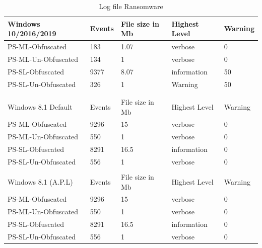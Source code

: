 \documentclass{article}%
\begin{document}
\begin{table}[]
\caption {Log file Ransomware}
\begin{center}
\begin{tabular}{|l|l|l|l|l|}
\hline
Windows 10/2016/2019 & Events & File size in Mb & Highest Level & Warning \\\hline
PS-ML-Obfuscated     & 183    & 1.07            & verbose       & 0       \\\hline
PS-ML-Un-Obfuscated  & 134    & 1               & verbose       & 0       \\\hline
PS-SL-Obfuscated     & 9377   & 8.07            & information   & 50      \\\hline
PS-SL-Un-Obfuscated  & 326    & 1               & Warning       & 50      \\\hline
                     &        &                 &               &         \\\hline
                     &        &                 &               &         \\\hline
Windows 8.1 Default  & Events & File size in Mb & Highest Level & Warning \\\hline
PS-ML-Obfuscated     & 9296   & 15              & verbose       & 0       \\\hline
PS-ML-Un-Obfuscated  & 550    & 1               & verbose       & 0       \\\hline
PS-SL-Obfuscated     & 8291   & 16.5            & information   & 0       \\\hline
PS-SL-Un-Obfuscated  & 556    & 1               & verbose       & 0       \\\hline
                     &        &                 &               &         \\\hline
Windows 8.1 (A.P.L)  & Events & File size in Mb & Highest Level & Warning \\\hline
PS-ML-Obfuscated     & 9296   & 15              & verbose       & 0       \\\hline
PS-ML-Un-Obfuscated  & 550    & 1               & verbose       & 0       \\\hline
PS-SL-Obfuscated     & 8291   & 16.5            & information   & 0       \\\hline
PS-SL-Un-Obfuscated  & 556    & 1               & verbose       & 0       \\\hline
\end{tabular}
\end{center}
\end{table}
\end{document}
